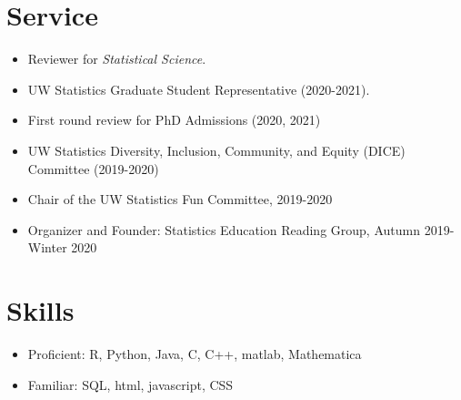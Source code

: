 \documentclass[margin, 10pt]{res} %
\begin{document}
\begin{resume}
{\section{Service}
\begin{itemize}
\item Reviewer for \textit{Statistical Science}.
      \item UW Statistics Graduate Student Representative (2020-2021). 
    \item First round review for PhD Admissions (2020, 2021) 
    \item UW Statistics Diversity, Inclusion, Community, and Equity (DICE) Committee (2019-2020)
    \item Chair of the UW Statistics Fun Committee, 2019-2020
    \item Organizer and Founder: Statistics Education Reading Group, Autumn 2019-Winter 2020
   \end{itemize}


\section{Skills}
\begin{itemize}
\item Proficient: R, Python, Java, C, C++, matlab, Mathematica
\item Familiar: SQL, html, javascript, CSS%
\end{itemize}


}
\end{resume}
\end{document}
